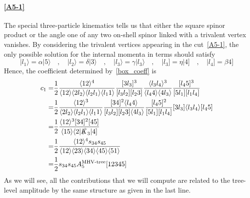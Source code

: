 \paragraph{\ref{A5-1}}
The special three-particle kinematics tells us that either the square spinor product or the angle one of any two on-shell spinor linked with a trivalent vertex vanishes.
By considering the trivalent vertices appearing in the cut~\cref{A5-1}, the only possible solution for the internal momenta in terms should satisfy
\begin{equation*}
|l_1\rangle = \alpha |5\rangle \quad,\quad
|l_2\rangle = \delta |3\rangle \quad,\quad
|l_3\rangle = \gamma |l_3\rangle\quad,\quad
|l_3] = \eta|4]\quad,\quad
|l_4] = \beta 4]
\end{equation*}
Hence, the coefficient determined by~\cref{box_coeff} is
\begin{equation*}
\begin{split}
c_1 = &
\frac{1}{2}\frac{\langle 12 \rangle^4}{\langle 1 2 \rangle \langle 2 l_2\rangle \langle l_2 l_1 \rangle\langle l_1 1 \rangle}
\frac{[3l_3]^3}{[l_3 l_2][l_2 3]}
\frac{\langle l_3 l_4 \rangle^{3}}{\langle l_4 4 \rangle \langle 4 l_3\rangle}
\frac{[l_4 5 ]^3}{[5l_1][l_1 l_4]}
\\
= & 
\frac{1}{2}\frac{\langle 12 \rangle^3}{\langle 2 l_2 \rangle\langle l_2 l_1 \rangle\langle l_1 1\rangle}
\frac{[34]^2\langle l_4 4\rangle}{[l_3 l_2][l_2 3]\langle 4 l_3\rangle}
\frac{[l_4 5]^2}{[5l_1 ][l_1 l_4]}
[3 l_3]\langle l_3 l_4 \rangle [l_4 5]
\\
= &
\frac{1}{2}
\frac{\langle 12 \rangle^3[34]^2[45]}{\langle 15 \rangle\langle2|\slashed{K}_{3}|4]}
\\
= &
\frac{1}{2}\frac{\langle 12 \rangle^4 s_{34}s_{45}}{\langle 12 \rangle\langle 23 \rangle \langle 34\rangle \langle 45\rangle \langle 51\rangle}
\\
= &
\frac{1}{2}s_{34}s_{45}A_5^{\textrm{MHV-tree}}[12345]
\end{split}
\end{equation*}
As we will see, all the contributions that we will compute are related to the tree-level amplitude by the same structure as given in the last line.   
%
%
%
\iffalse
\begin{figure}
  \centering
    \texttt{[image: A5-8]}
    \caption{A5-8}
  \label{A5-8}
\end{figure}
\fi
